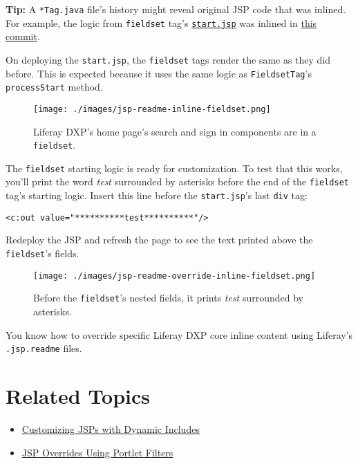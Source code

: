 \noindent\hrulefill

\textbf{Tip:} A \texttt{*Tag.java} file's history might reveal original
JSP code that was inlined. For example, the logic from \texttt{fieldset}
tag's
\href{https://github.com/liferay/liferay-portal/blob/df22ba66eff49b76404cfda908d3cd024efbebd9/portal-web/docroot/html/taglib/aui/fieldset/start.jsp}{\texttt{start.jsp}}
was inlined in
\href{https://github.com/liferay/liferay-portal/commit/7fba0775bcc1d1a0bc4d107cabfb41a90f15937c\#diff-2ad802b4c0d8f7a2da45b895e89d6e46}{this
commit}.

\noindent\hrulefill

On deploying the \texttt{start.jsp}, the \texttt{fieldset} tags render
the same as they did before. This is expected because it uses the same
logic as \texttt{FieldsetTag}'s \texttt{processStart} method.

\begin{figure}
\centering
\texttt{[image: ./images/jsp-readme-inline-fieldset.png]}
\caption{Liferay DXP's home page's search and sign in components are in
a \texttt{fieldset}.}
\end{figure}

The \texttt{fieldset} starting logic is ready for customization. To test
that this works, you'll print the word \emph{test} surrounded by
asterisks before the end of the \texttt{fieldset} tag's starting logic.
Insert this line before the \texttt{start.jsp}'s last \texttt{div} tag:

\begin{verbatim}
<c:out value="**********test**********"/>
\end{verbatim}

Redeploy the JSP and refresh the page to see the text printed above the
\texttt{fieldset}'s fields.

\begin{figure}
\centering
\texttt{[image: ./images/jsp-readme-override-inline-fieldset.png]}
\caption{Before the \texttt{fieldset}'s nested fields, it prints
\emph{test} surrounded by asterisks.}
\end{figure}

You know how to override specific Liferay DXP core inline content using
Liferay's \texttt{.jsp.readme} files.

\section{Related Topics}\label{related-topics-19}

\begin{itemize}
\tightlist
\item
  \href{/docs/7-2/customization/-/knowledge_base/c/customizing-jsps-with-dynamic-includes}{Customizing
  JSPs with Dynamic Includes}
\item
  \href{/docs/7-2/customization/-/knowledge_base/c/jsp-overrides-using-portlet-filters}{JSP
  Overrides Using Portlet Filters}
\end{itemize}

